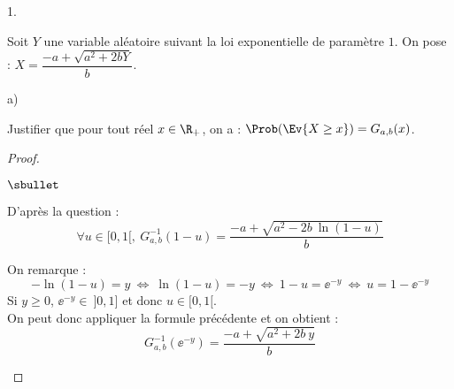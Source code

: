 \documentclass[11pt]{article}%
\begin{document}
\begin{noliste}{1.}
  \newpage


\item Soit $Y$ une variable aléatoire suivant la loi exponentielle de
  paramètre $1$. On pose : $X = \dfrac{-a+\sqrt{a^2+2bY}}{b}$.
  \begin{noliste}{a)}
    \setlength{\itemsep}{2mm}
  \item Justifier que pour tout réel $x\in\R_+$, on a : $\Prob(\Ev{X\geq
      x}) = G_{a,b}(x)$.

    \begin{proof}~
      \begin{noliste}{$\sbullet$}
      \item D'après la question  :
        \[
        \forall u \in [0,1[, \ G^{-1}_{a,b}(1-u) = \dfrac{-a +
          \sqrt{a^2 - 2b \ \ln(1-u)}}{b}
        \]

        On remarque :
        \[
         -\ln(1-u) = y \ \Leftrightarrow \ \ln(1-u) = -y \ 
	 \Leftrightarrow \ 1 - u = \ee^{-y} \ \Leftrightarrow \
	 u = 1 - \ee^{-y}
        \]
        Si $y \geq 0$, $\ee^{-y} \in \ ]0, 1]$ et donc $u \in [0, 1[$.\\
        On peut donc appliquer la formule précédente et
        on obtient :
        \[
        G^{-1}_{a,b}(\ee^{-y}) = \dfrac{-a + \sqrt{a^2 + 2b \ y}}{b}
        \]


\end{noliste}
\end{proof}
\end{noliste}
\end{noliste}
\end{document}
